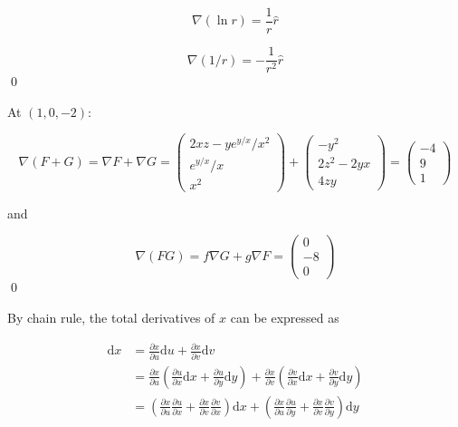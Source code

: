 \documentclass[12pt]{article}
\begin{document}




\begin{equation}
    \nabla (\ln{r}) = \frac{1}{r} \hat{r}
\end{equation}

\begin{equation}
    \nabla (1/r) = -\frac{1}{r^2} \hat{r}
\end{equation}
\qed


At $(1, 0, -2)$:

\begin{equation}
    \nabla (F + G) = \nabla F + \nabla G =
    \begin{pmatrix}
        2xz - ye^{y/x}/x^{2} \\
        e^{y/x}/x            \\
        x^{2}
    \end{pmatrix}
    +
    \begin{pmatrix}
        -y^{2}       \\
        2z^{2} - 2yx \\
        4zy
    \end{pmatrix}
    =
    \begin{pmatrix}
        -4 \\
        9  \\
        1
    \end{pmatrix}
\end{equation}

and

\begin{equation}
    \nabla (FG) = f \nabla G + g \nabla F =
    \begin{pmatrix}
        0  \\
        -8 \\
        0
    \end{pmatrix}
\end{equation}
\qed



By chain rule, the total derivatives of $x$ can be expressed as

\begin{equation}
    \begin{split}
        \mathrm{d}x &= \frac{\partial x}{\partial u} \mathrm{d}u + \frac{\partial x}{\partial v} \mathrm{d}v \\
        &= \frac{\partial x}{\partial u} \left( \frac{\partial u}{\partial x} \mathrm{d}x + \frac{\partial u}{\partial y} \mathrm{d}y \right) + \frac{\partial x}{\partial v} \left( \frac{\partial v}{\partial x} \mathrm{d}x + \frac{\partial v}{\partial y} \mathrm{d}y \right) \\
        &= \left( \frac{\partial x}{\partial u} \frac{\partial u}{\partial x} + \frac{\partial x}{\partial v} \frac{\partial v}{\partial x} \right) \mathrm{d}x + \left( \frac{\partial x}{\partial u} \frac{\partial u}{\partial y} + \frac{\partial x}{\partial v} \frac{\partial v}{\partial y} \right) \mathrm{d}y
    \end{split}
\end{equation}
\end{document}
